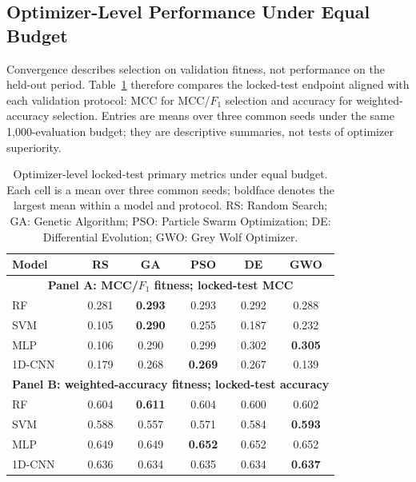 \FloatBarrier

\subsection{Optimizer-Level Performance Under Equal Budget}

Convergence describes selection on validation fitness, not performance on the held-out period. Table~\ref{tab:optimizer_primary_metrics} therefore compares the locked-test endpoint aligned with each validation protocol: MCC for MCC/$F_1$ selection and accuracy for weighted-accuracy selection. Entries are means over three common seeds under the same 1,000-evaluation budget; they are descriptive summaries, not tests of optimizer superiority.

\begin{table}[htbp]
\centering
\caption{Optimizer-level locked-test primary metrics under equal budget. Each cell is a mean over three common seeds; boldface denotes the largest mean within a model and protocol. RS: Random Search; GA: Genetic Algorithm; PSO: Particle Swarm Optimization; DE: Differential Evolution; GWO: Grey Wolf Optimizer.}
\label{tab:optimizer_primary_metrics}
\footnotesize
\begin{tabular}{lccccc}\toprule
\textbf{Model} & \textbf{RS} & \textbf{GA} & \textbf{PSO} & \textbf{DE} & \textbf{GWO}\\\midrule
\multicolumn{6}{c}{\textbf{Panel A: MCC/$F_1$ fitness; locked-test MCC}}\\\midrule
RF & 0.281 & \textbf{0.293} & 0.293 & 0.292 & 0.288\\
SVM & 0.105 & \textbf{0.290} & 0.255 & 0.187 & 0.232\\
MLP & 0.106 & 0.290 & 0.299 & 0.302 & \textbf{0.305}\\
1D-CNN & 0.179 & 0.268 & \textbf{0.269} & 0.267 & 0.139\\\midrule
\multicolumn{6}{c}{\textbf{Panel B: weighted-accuracy fitness; locked-test accuracy}}\\\midrule
RF & 0.604 & \textbf{0.611} & 0.604 & 0.600 & 0.602\\
SVM & 0.588 & 0.557 & 0.571 & 0.584 & \textbf{0.593}\\
MLP & 0.649 & 0.649 & \textbf{0.652} & 0.652 & 0.652\\
1D-CNN & 0.636 & 0.634 & 0.635 & 0.634 & \textbf{0.637}\\\bottomrule
\end{tabular}
\end{table}


